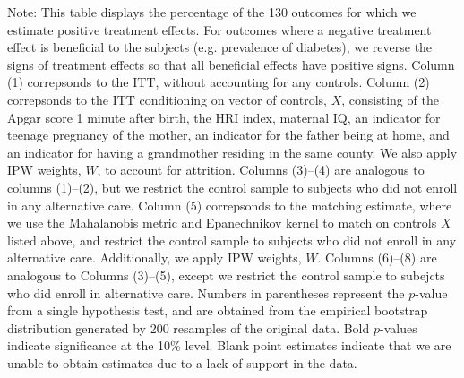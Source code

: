 \begin{table}[H]
\begin{threeparttable}
\begin{tabular}{cccccccccc}
  \hline\hline
  \end{tabular}
    \begin{tablenotes}
    \scriptsize
    \item 
Note: This table displays the percentage of the 130 outcomes for which we estimate positive
treatment effects. For outcomes where a negative treatment effect is beneficial to the subjects
(e.g. prevalence of diabetes), we reverse the signs of treatment effects so that all beneficial 
effects have positive signs.
Column (1) correpsonds to the ITT, without accounting for any controls.
Column (2) correpsonds to the ITT conditioning on vector of controls, $X$, consisting of the Apgar score 1 minute after birth, the HRI index, maternal IQ, an
indicator for teenage pregnancy of the mother, an indicator for the father being at 
home, and an indicator for having a grandmother residing in the same county. We also apply IPW weights, $W$, to account for attrition.
Columns (3)--(4) are analogous to columns (1)--(2), but we restrict the control sample to subjects
who did not enroll in any alternative care.
Column (5) correpsonds to the matching estimate, where we use the Mahalanobis metric and Epanechnikov kernel
to match on controls $X$ listed above, and restrict the control sample to subjects who did not enroll
in any alternative care. Additionally, we apply IPW weights, $W$.
Columns (6)--(8) are analogous to Columns (3)--(5), except we restrict the control sample to subejcts
who did enroll in alternative care. 
Numbers in parentheses represent the $p$-value from a single hypothesis test, and are obtained from 
the empirical bootstrap distribution generated by 200 resamples of the original data. 
Bold $p$-values indicate significance at the 10\% level. Blank point estimates indicate that
we are unable to obtain estimates due to a lack of support in the data. 

    \end{tablenotes}
  \end{threeparttable}

\end{table}